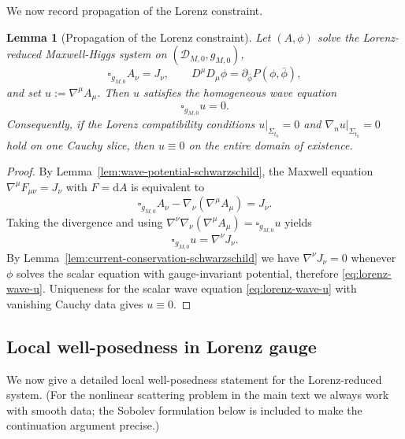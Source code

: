 \documentclass[11pt]{article}
\numberwithin{equation}{section}
\theoremstyle{plain}
\newtheorem{lemma}[theorem]{Lemma}
\theoremstyle{definition}
\theoremstyle{remark}
\newcommand{\dd}{\mathrm{d}}
\begin{document}
We now record propagation of the Lorenz constraint.

\begin{lemma}[Propagation of the Lorenz constraint]\label{lem:lorenz-propagation-schwarzschild}
Let $(A,\phi)$ solve the Lorenz-reduced Maxwell-Higgs system on $(\mathcal D_{M,0},g_{M,0})$,
\begin{equation}\label{eq:lorenz-reduced-schwarzschild}
\square_{g_{M,0}}A_{\nu}=J_{\nu},
\qquad
D^{\mu}D_{\mu}\phi=\partial_{\bar\phi}P(\phi,\bar\phi),
\end{equation}
and set $u:=\nabla^\mu A_\mu$.
Then $u$ satisfies the homogeneous wave equation
\begin{equation}\label{eq:lorenz-wave-u}
\square_{g_{M,0}}u=0.
\end{equation}
Consequently, if the Lorenz compatibility conditions
$u|_{\Sigma_{t_0}}=0$ and $\nabla_n u|_{\Sigma_{t_0}}=0$ hold on one Cauchy slice, then $u\equiv 0$ on the entire domain of existence.
\end{lemma}

\begin{proof}
By Lemma~\ref{lem:wave-potential-schwarzschild}, the Maxwell equation $\nabla^\mu F_{\mu\nu}=J_\nu$ with $F=\dd A$ is equivalent to
\begin{equation}
\square_{g_{M,0}}A_\nu-\nabla_\nu(\nabla^\mu A_\mu)=J_\nu.
\end{equation}
Taking the divergence and using $\nabla^\nu\nabla_\nu(\nabla^\mu A_\mu)=\square_{g_{M,0}}u$ yields
\begin{equation}
\square_{g_{M,0}}u=\nabla^\nu J_\nu.
\end{equation}
By Lemma~\ref{lem:current-conservation-schwarzschild} we have $\nabla^\nu J_\nu=0$ whenever $\phi$ solves the scalar equation with gauge-invariant potential,
therefore \eqref{eq:lorenz-wave-u}.
Uniqueness for the scalar wave equation \eqref{eq:lorenz-wave-u} with vanishing Cauchy data gives $u\equiv 0$.
\end{proof}

\subsection{Local well-posedness in Lorenz gauge}\label{app:schw-lwp}

We now give a detailed local well-posedness statement for the Lorenz-reduced system.
(For the nonlinear scattering problem in the main text we always work with smooth data; the Sobolev formulation below is included to make the continuation argument precise.)
\end{document}
